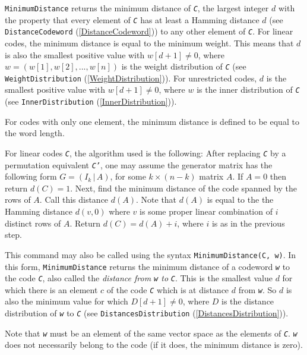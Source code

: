 \documentclass[a4paper,11pt]{report}
\begin{document}
{{{ \texttt{MinimumDistance} returns the minimum distance of \mbox{\texttt{\slshape C}}, the largest integer $d$ with the property that every element of \mbox{\texttt{\slshape C}} has at least a Hamming distance $d$ (see \texttt{DistanceCodeword} (\ref{DistanceCodeword})) to any other element of \mbox{\texttt{\slshape C}}. For linear codes, the minimum distance is equal to the minimum weight. This
means that $d$ is also the smallest positive value with $w[d+1] \neq 0$, where $w=(w[1],w[2],...,w[n])$ is the weight distribution of \mbox{\texttt{\slshape C}} (see \texttt{WeightDistribution} (\ref{WeightDistribution})). For unrestricted codes, $d$ is the smallest positive value with $w[d+1] \neq 0$, where $w$ is the inner distribution of \mbox{\texttt{\slshape C}} (see \texttt{InnerDistribution} (\ref{InnerDistribution})). 

 For codes with only one element, the minimum distance is defined to be equal
to the word length. 

 For linear codes \mbox{\texttt{\slshape C}}, the algorithm used is the following: After replacing \mbox{\texttt{\slshape C}} by a permutation equivalent \mbox{\texttt{\slshape C'}}, one may assume the generator matrix has the following form $G=(I_{k} \, | \, A)$, for some $k\times (n-k)$ matrix $A$. If $A=0$ then return $d(C)=1$. Next, find the minimum distance of the code spanned by the rows of $A$. Call this distance $d(A)$. Note that $d(A)$ is equal to the the Hamming distance $d(v,0)$ where $v$ is some proper linear combination of $i$ distinct rows of $A$. Return $d(C)=d(A)+i$, where $i$ is as in the previous step. 

 This command may also be called using the syntax \texttt{MinimumDistance(C, w)}. In this form, \texttt{MinimumDistance} returns the minimum distance of a codeword \mbox{\texttt{\slshape w}} to the code \mbox{\texttt{\slshape C}}, also called the \emph{distance from \mbox{\texttt{\slshape w}} to} \mbox{\texttt{\slshape C}}. This is the smallest value $d$ for which there is an element $c$ of the code \mbox{\texttt{\slshape C}} which is at distance $d$ from \mbox{\texttt{\slshape w}}. So $d$ is also the minimum value for which $D[d+1] \neq 0$, where $D$ is the distance distribution of \mbox{\texttt{\slshape w}} to \mbox{\texttt{\slshape C}} (see \texttt{DistancesDistribution} (\ref{DistancesDistribution})). 

 Note that \mbox{\texttt{\slshape w}} must be an element of the same vector space as the elements of \mbox{\texttt{\slshape C}}. \mbox{\texttt{\slshape w}} does not necessarily belong to the code (if it does, the minimum distance is
zero). }

}}
\end{document}

